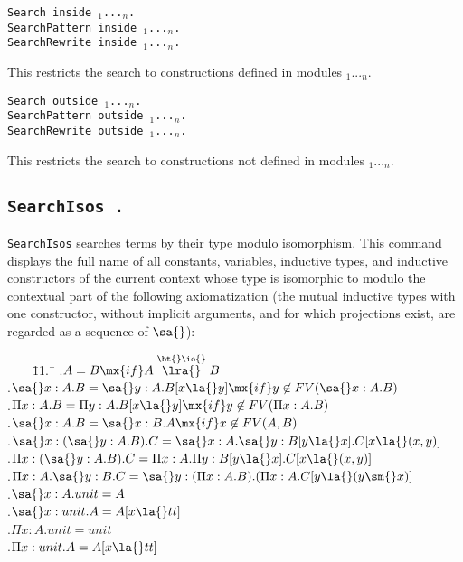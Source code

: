\begin{Variants}
\item
{\tt Search {\qualid} inside
{\module$_1$}...{\module$_n$}.}\\
{\tt SearchPattern {\term} inside
{\module$_1$}...{\module$_n$}.}\\
{\tt SearchRewrite {\term} inside
{\module$_1$}...{\module$_n$}.}

This restricts the search to constructions defined in modules {\module$_1$}...{\module$_n$}.

\item {\tt Search {\qualid} outside {\module$_1$}...{\module$_n$}.}\\
{\tt SearchPattern {\term} outside {\module$_1$}...{\module$_n$}.}\\
{\tt SearchRewrite {\term} outside {\module$_1$}...{\module$_n$}.}

  This restricts the search to constructions not defined in modules
{\module$_1$}...{\module$_n$}.

\end{Variants}

\subsection{\tt SearchIsos {\term}.}
\label{searchisos}
\texttt{SearchIsos} searches terms by their type modulo isomorphism.
This command displays the full name of all constants, variables,
inductive types, and inductive constructors of the current
context whose type is isomorphic to {\term} modulo the contextual part of the
following axiomatization (the mutual inductive types with one constructor,
without implicit arguments, and for which projections exist, are regarded as a
sequence of $\sa{}$):


\begin{tabbing}
\ \ \ \ \=11.\ \=\kill
{}.\>$A=B\mx{ if }A\stackrel{\bt{}\io{}}{\lra{}}B$\\
.\>$\sa{}x:A.B=\sa{}y:A.B[x\la{}y]\mx{ if }y\not\in{}FV(\sa{}x:A.B)$\\
.\>$\Pi{}x:A.B=\Pi{}y:A.B[x\la{}y]\mx{ if }y\not\in{}FV(\Pi{}x:A.B)$\\
.\>$\sa{}x:A.B=\sa{}x:B.A\mx{ if }x\not\in{}FV(A,B)$\\
.\>$\sa{}x:(\sa{}y:A.B).C=\sa{}x:A.\sa{}y:B[y\la{}x].C[x\la{}(x,y)]$\\
.\>$\Pi{}x:(\sa{}y:A.B).C=\Pi{}x:A.\Pi{}y:B[y\la{}x].C[x\la{}(x,y)]$\\
.\>$\Pi{}x:A.\sa{}y:B.C=\sa{}y:(\Pi{}x:A.B).(\Pi{}x:A.C[y\la{}(y\sm{}x)]$\\
.\>$\sa{}x:A.unit=A$\\
.\>$\sa{}x:unit.A=A[x\la{}tt]$\\
.\>$\Pi{}x:A.unit=unit$\\
.\>$\Pi{}x:unit.A=A[x\la{}tt]$
\end{tabbing}

